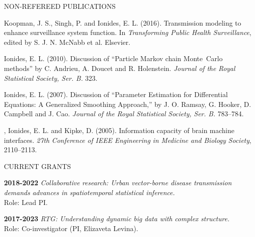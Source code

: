 \lsp
\begin{reflist} {NON-REFEREED PUBLICATIONS}

\item
Koopman, J. S., Singh, P. and Ionides, E. L. (2016). Transmission modeling to enhance surveillance system function. In {\em Transforming Public Health Surveillance}, edited by S. J. N. McNabb et al. Elsevier.

\item\formal{[[\ionidesJRSSBb] ]} 
Ionides, E. L. (2010). Discussion of ``Particle Markov chain Monte~Carlo methods'' by C. Andrieu, A. Doucet and R. Holenstein.
{\em Journal of the Royal Statistical Society, Ser. B.} {}{\separator}323.

\item\formal{[[\ionidesJRSSBa] ]}  
Ionides, E. L. (2007). Discussion of ``Parameter Estimation for Differential Equations: A Generalized Smoothing Approach,'' by J. O. Ramsay, G. Hooker, D. Campbell and J. Cao. 
{\em Journal of the Royal Statistical Society, Ser. B.} {}{\separator}783--784.

\item\formal{[[\gageEMBS] ]}  
, Ionides, E. L. and
  Kipke, D. (2005). Information capacity of brain machine
  interfaces. {\em 27th Conference of IEEE Engineering in
  Medicine and Biology Society}, 2110--2113.


\end{reflist}


\lsp

\begin{mylist} {CURRENT GRANTS}

\item{\bf 2018-2022} {\em Collaborative research: Urban vector-borne disease transmission demands advances in spatiotemporal statistical inference.}
\\
Role: Lead PI.


\item{\bf 2017-2023 } {\em RTG: Understanding dynamic big data with complex structure.} 
\\
Role: Co-investigator (PI, Elizaveta Levina). 


\end{mylist}

